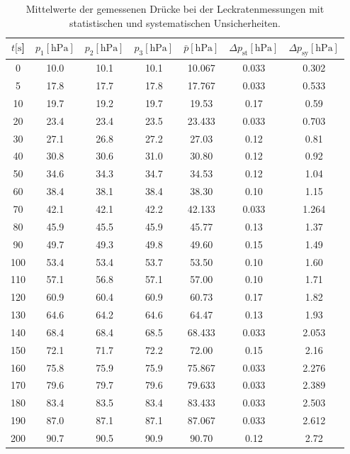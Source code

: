 %
\begin{table}[H]
  \centering
    \caption{Mittelwerte der gemessenen Drücke bei der Leckratenmessungen mit statistischen und systematischen Unsicherheiten.}
    \label{tab:Dreh_Leck2}
    \begin{tabular}{
      S[table-format=3.0] 
      S[table-format=2.1] S[table-format=2.1] S[table-format=2.1]
      S[table-format=2.2] S[table-format=1.2] S[table-format=1.2]
      }
      \toprule
      {$t [\si{\second}$]} &
      {$p_1 [\si{\hecto\pascal}]$} & {$p_2 [\si{\hecto\pascal}]$} & {$p_3 [\si{\hecto\pascal}]$} &
      {$\bar{p} [\si{\hecto\pascal}]$} & {$\Delta p_\text{st} [\si{\hecto\pascal}]$} & {$\Delta p_\text{sy} [\si{\hecto\pascal}]$}\\
           & 10.0 & 10.1 & 10.1 & 10.067 & 0.033 & 0.302 \\
      5     & 17.8 & 17.7 & 17.8 & 17.767 & 0.033 & 0.533 \\
      10    & 19.7 & 19.2 & 19.7 & 19.53  & 0.17  & 0.59  \\
      20    & 23.4 & 23.4 & 23.5 & 23.433 & 0.033 & 0.703 \\
      30    & 27.1 & 26.8 & 27.2 & 27.03  & 0.12  & 0.81  \\
      40    & 30.8 & 30.6 & 31.0 & 30.80  & 0.12  & 0.92  \\
      50    & 34.6 & 34.3 & 34.7 & 34.53  & 0.12  & 1.04  \\
      60    & 38.4 & 38.1 & 38.4 & 38.30  & 0.10  & 1.15  \\
      70    & 42.1 & 42.1 & 42.2 & 42.133 & 0.033 & 1.264 \\
      80    & 45.9 & 45.5 & 45.9 & 45.77  & 0.13  & 1.37  \\
      90    & 49.7 & 49.3 & 49.8 & 49.60  & 0.15  & 1.49  \\
      100   & 53.4 & 53.4 & 53.7 & 53.50  & 0.10  & 1.60  \\
      110   & 57.1 & 56.8 & 57.1 & 57.00  & 0.10  & 1.71  \\
      120   & 60.9 & 60.4 & 60.9 & 60.73  & 0.17  & 1.82  \\
      130   & 64.6 & 64.2 & 64.6 & 64.47  & 0.13  & 1.93  \\
      140   & 68.4 & 68.4 & 68.5 & 68.433 & 0.033 & 2.053 \\
      150   & 72.1 & 71.7 & 72.2 & 72.00  & 0.15  & 2.16  \\
      160   & 75.8 & 75.9 & 75.9 & 75.867 & 0.033 & 2.276 \\
      170   & 79.6 & 79.7 & 79.6 & 79.633 & 0.033 & 2.389 \\
      180   & 83.4 & 83.5 & 83.4 & 83.433 & 0.033 & 2.503 \\
      190   & 87.0 & 87.1 & 87.1 & 87.067 & 0.033 & 2.612 \\
      200   & 90.7 & 90.5 & 90.9 & 90.70  & 0.12  & 2.72  \\
    \bottomrule
    \end{tabular}
\end{table}
